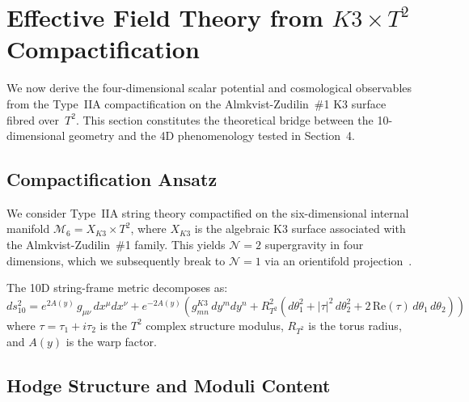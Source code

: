 
\section{Effective Field Theory from $K3 \times T^2$ Compactification}
\label{sec:eft_bridge}

We now derive the four-dimensional scalar potential and cosmological observables from the Type~IIA compactification on the Almkvist-Zudilin~\#1 K3 surface fibred over~$T^2$.  This section constitutes the theoretical bridge between the 10-dimensional geometry and the 4D phenomenology tested in Section~4.

\subsection{Compactification Ansatz}

We consider Type~IIA string theory compactified on the six-dimensional internal manifold $\mathcal{M}_6 = X_{K3} \times T^2$, where $X_{K3}$ is the algebraic K3 surface associated with the Almkvist-Zudilin~\#1 family.  This yields $\mathcal{N}=2$ supergravity in four dimensions, which we subsequently break to $\mathcal{N}=1$ via an orientifold projection~\cite{AspinwallK3,Vafa1996}.

The 10D string-frame metric decomposes as:
\begin{equation}
    ds^2_{10} = e^{2A(y)}\, g_{\mu\nu}\, dx^\mu dx^\nu + e^{-2A(y)} \left( g_{mn}^{K3}\, dy^m dy^n + R_{T^2}^2 \left(d\theta_1^2 + |\tau|^2\, d\theta_2^2 + 2\,\text{Re}(\tau)\, d\theta_1\, d\theta_2\right) \right)
    \label{eq:metric_ansatz}
\end{equation}
where $\tau = \tau_1 + i\tau_2$ is the $T^2$ complex structure modulus, $R_{T^2}$ is the torus radius, and $A(y)$ is the warp factor.

\subsection{Hodge Structure and Moduli Content}
\label{subsec:hodge}

